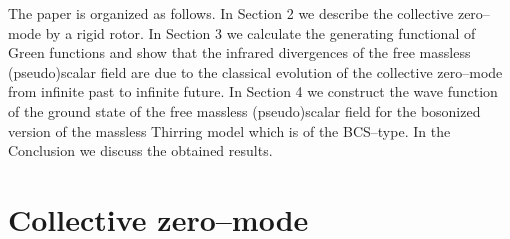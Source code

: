 \documentclass[a4paper,12pt] {article}
\begin{document}
The paper is organized as follows. In Section 2 we describe the
collective zero--mode by a rigid rotor. In Section 3 we calculate the
generating functional of Green functions and show that the infrared
divergences of the free massless (pseudo)scalar field are due to the
classical evolution of the collective zero--mode from infinite past to
infinite future. In Section 4 we construct the wave function of the
ground state of the free massless (pseudo)scalar field for the
bosonized version of the massless Thirring model which is of the
BCS--type.  In the Conclusion we discuss the obtained results.

\section{Collective zero--mode}
\setcounter{equation}{0}
\end{document}
